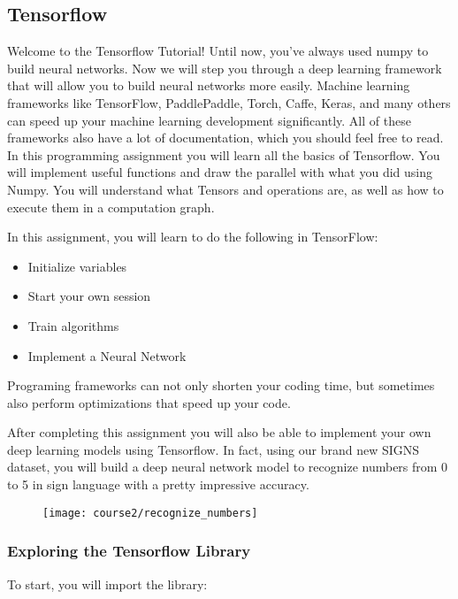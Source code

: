 \subsection{Tensorflow}

Welcome to the Tensorflow Tutorial! Until now, you've always used numpy to build neural networks. Now we will step you through a deep learning framework that will allow you to build neural networks more easily. Machine learning frameworks like TensorFlow, PaddlePaddle, Torch, Caffe, Keras, and many others can speed up your machine learning development significantly. All of these frameworks also have a lot of documentation, which you should feel free to read. In this programming assignment you will learn all the basics of Tensorflow. You will implement useful functions and draw the parallel with what you did using Numpy. You will understand what Tensors and operations are, as well as how to execute them in a computation graph.

In this assignment, you will learn to do the following in TensorFlow:
\begin{itemize}
\item Initialize variables
\item Start your own session
\item Train algorithms
\item Implement a Neural Network
\end{itemize}

Programing frameworks can not only shorten your coding time, but sometimes also perform optimizations that speed up your code.


After completing this assignment you will also be able to implement your own deep learning models using Tensorflow. In fact, using our brand new SIGNS dataset, you will build a deep neural network model to recognize numbers from 0 to 5 in sign language with a pretty impressive accuracy.

\begin{figure}[h]
\begin{center}
\texttt{[image: course2/recognize\_numbers]}
\end{center}
\label{fig:recognize_numbers}
\end{figure}



\subsubsection{Exploring the Tensorflow Library}
To start, you will import the library:

